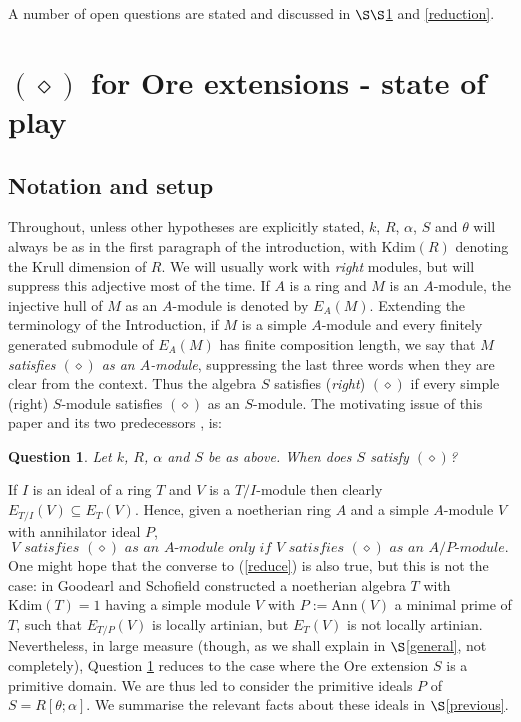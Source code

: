 \documentclass[a4paper, 11pt]{article}
\newtheorem{question}[theorem]{Question}
\theoremstyle{definition}
\begin{document}
A number of open questions are stated and discussed in $\S\S$\ref{survey} and \ref{reduction}. 





\bigskip

\section{$(\diamond)$ for Ore extensions - state of play}\label{survey}
\subsection{Notation and setup}\label{notation} Throughout, unless other hypotheses are explicitly stated, $k$, $R$, $\alpha$, $S$ and $\theta$ will always be as in the first paragraph of the introduction, with $\mathrm{Kdim}(R)$ denoting the Krull dimension of $R$. We will usually work with {\it right} modules, but will suppress this adjective most of the time. If $A$ is a ring and $M$ is an $A$-module, the injective hull of $M$ as an $A$-module is denoted by $E_A(M)$. Extending the terminology of the Introduction, if $M$ is a simple $A$-module and every finitely generated submodule of $E_A(M)$ has finite composition length, we say that $M$ {\it satisfies $(\diamond)$ as an $A$-module}, suppressing the last three words when they are clear from the context. Thus the algebra $S$ satisfies ({\it right}) $(\diamond)$ if every simple (right) $S$-module satisfies $(\diamond)$ as an $S$-module. The motivating issue of this paper and its two predecessors \cite{BCM}, \cite{BCM2} is:

\begin{question}\label{keyqn} Let $k$, $R$, $\alpha$ and $S$ be as above. When does $S$ satisfy $(\diamond)$?
\end{question}

If $I$ is an ideal of a ring $T$ and $V$ is a $T/I$-module then clearly $E_{T/I}(V) \subseteq E_T(V)$. Hence, given a noetherian ring $A$ and a simple $A$-module $V$ with annihilator ideal $P$, 
\begin{equation}\label{reduce} V \textit{ satisfies } (\diamond) \textit{ as an } A\textit{-module only if } V \textit{ satisfies } (\diamond) \textit{ as an } A/P \textit{-module}.
\end{equation}
\noindent  One might hope that the converse to (\ref{reduce}) is also true, but this is not the case: in \cite{GS} Goodearl and Schofield constructed a noetherian algebra $T$ with $\mathrm{Kdim}(T) = 1$ having a simple module $V$ with $ P := \mathrm{Ann}(V)$ a minimal prime of $T$, such that $E_{T/P}(V)$ is locally artinian, but $E_T(V)$ is not locally artinian. Nevertheless, in large measure (though, as we shall explain in $\S$\ref{general}, not completely), Question \ref{keyqn} reduces to the case where the Ore extension $S$ is a primitive domain. We are thus led to consider the primitive ideals $P$ of $S = R[\theta; \alpha]$. We summarise the relevant facts about these ideals in $\S$\ref{previous}.
\end{document}
